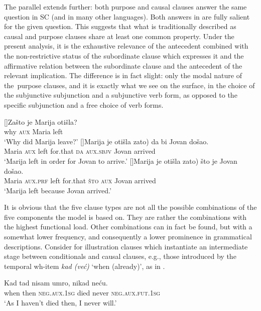 \documentclass[output=paper,
colorlinks,
citecolor=brown,
newtxmath
]{langscibook}
\begin{document}
\noindent The parallel extends further: both purpose and causal clauses answer the same question in SC (and in many other languages). Both answers in  are fully salient for the given question. This suggests that what is traditionally described as causal and purpose clauses share at least one common property. Under the present analysis, it is the exhaustive relevance of the antecedent combined with the non-restrictive status of the subordinate clause which expresses it and the affirmative relation between the subordinate clause and the antecedent of the relevant implication. The difference is in fact slight: only the modal nature of the~purpose clauses, and it is exactly what we see on the surface, in the choice of the subjunctive subjunction and a subjunctive verb form, as opposed to the specific subjunction and a free choice of verb forms.

\ea\label{ex:Zašto}
\begin{xlist}
    []{\gll Zašto je Marija otišla?\\
    why \textsc{aux} Maria left\\
    \glt `Why did Marija leave?'}
    []{\gll Marija je otišla \minsp{(} zato) da bi Jovan došao.\\
    Maria \textsc{aux} left {} for.that \textsc{da} \textsc{aux.sbjv} Jovan arrived\\
    \glt `Marija left in order for Jovan to arrive.'}
    []{\gll Marija je otišla \minsp{(} zato) što je Jovan došao.\\
    Maria \textsc{aux.prf} left {} for.that \textsc{što} \textsc{aux} Jovan arrived\\
\glt `Marija left because Jovan arrived.'}
\end{xlist}
\z

\noindent It is obvious that the five clause types are not all the possible combinations of the five components the model is based on. They are rather the combinations with the highest functional load. Other combinations can in fact be found, but with a somewhat lower frequency, and consequently a lower prominence in grammatical descriptions. Consider for illustration clauses which instantiate an intermediate stage between conditionals and causal clauses, e.g., those introduced by the temporal wh-item \textit{kad (već)} `when (already)', as in .

\ea\label{ex:kad}
    \gll Kad tad nisam umro, nikad neću.\\
    when then \textsc{neg.aux.1sg} died never \textsc{neg.aux.fut.1sg}\\
    \glt `As I haven't died then, I never will.'
\z
\end{document}
